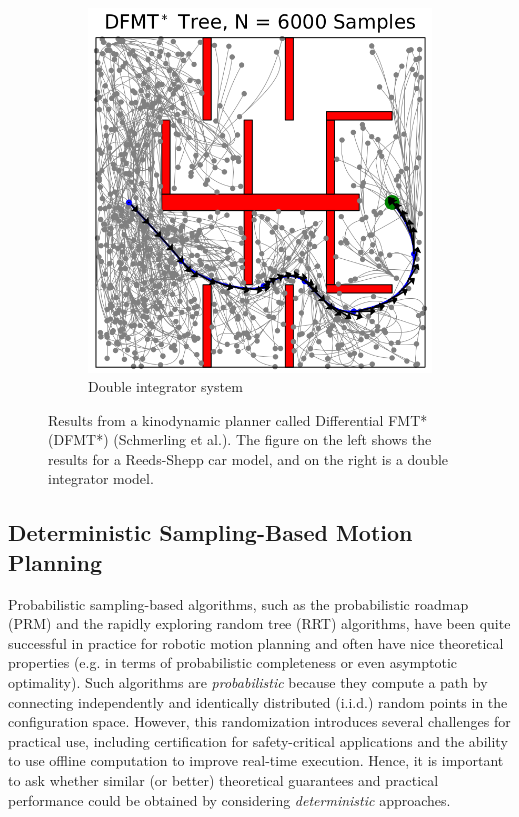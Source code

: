 \begin{figure}[ht]
\begin{subfigure}[b]{0.4\linewidth}
      \includegraphics[width=\linewidth]{tex/figs/ch07_figs/drift.png}
      \caption{Double integrator system}
    \end{subfigure}
    \caption{Results from a kinodynamic planner called Differential FMT* (DFMT*) (Schmerling et al.). The figure on the left shows the results for a Reeds-Shepp car model, and on the right is a double integrator model.}
    \label{fig:kino}
\end{figure}


\subsection{Deterministic Sampling-Based Motion Planning}

Probabilistic sampling-based algorithms, such as the probabilistic roadmap (PRM) and the rapidly exploring random tree (RRT) algorithms, have been quite successful in practice for robotic motion planning and often have nice theoretical properties (e.g. in terms of probabilistic completeness or even asymptotic optimality). Such algorithms are \textit{probabilistic} because they compute a path by connecting independently and identically distributed (i.i.d.) random points in the configuration space. However, this randomization introduces several challenges for practical use, including certification for safety-critical applications and the ability to use offline computation to improve real-time execution. Hence, it is important to ask whether similar (or better) theoretical guarantees and practical performance could be obtained by considering \textit{deterministic} approaches.

